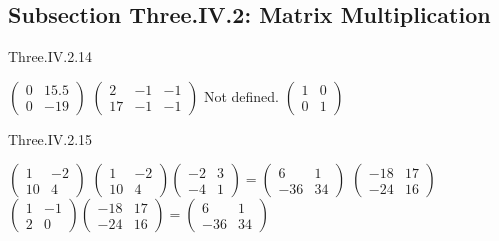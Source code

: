 \subsection{Subsection Three.IV.2: Matrix Multiplication}
\begin{ans}{Three.IV.2.14}
      \begin{exparts*}
        \partsitem
          $\begin{pmatrix}
            0  &15.5  \\
            0  &-19
          \end{pmatrix}$
        \partsitem \(
          \begin{pmatrix}
            2  &-1  &-1  \\
           17  &-1  &-1
          \end{pmatrix} \)
        \partsitem Not defined.
        \partsitem \( \begin{pmatrix}
                   1  &0  \\
                   0  &1
                 \end{pmatrix}  \)
      \end{exparts*}
    
\end{ans}
\begin{ans}{Three.IV.2.15}
      \begin{exparts*}
        \partsitem \(
          \begin{pmatrix}
            1  &-2   \\
            10 &4
          \end{pmatrix}  \)
        \partsitem \(
          \begin{pmatrix}
            1  &-2   \\
            10 &4
          \end{pmatrix}
          \begin{pmatrix}
            -2 &3    \\
            -4 &1
          \end{pmatrix}=
          \begin{pmatrix}
            6  &1    \\
           -36 &34
          \end{pmatrix}  \)
        \partsitem \(
          \begin{pmatrix}
           -18 &17   \\
           -24 &16
          \end{pmatrix}  \)
        \partsitem \(
          \begin{pmatrix}
            1  &-1  \\
            2  &0
          \end{pmatrix}
          \begin{pmatrix}
           -18 &17   \\
           -24 &16
          \end{pmatrix}=
          \begin{pmatrix}
            6  &1    \\
           -36 &34
          \end{pmatrix}  \)
      \end{exparts*}
    
\end{ans}
